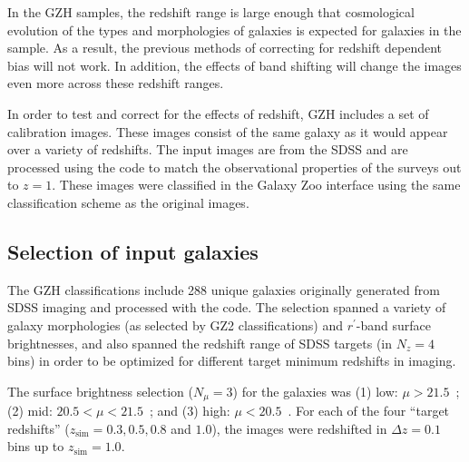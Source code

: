 \documentclass[twocolumn]{aastex6}
\begin{document}
In the GZH samples, the redshift range is large enough that cosmological evolution of the types and morphologies of galaxies is expected for galaxies in the sample. As a result, the previous methods of correcting for redshift dependent bias will not work. In addition, the effects of band shifting will change the images even more across these redshift ranges. %

In order to test and correct for the effects of redshift, GZH includes a set of calibration images. These images consist of the same galaxy as it would appear over a variety of redshifts. The input images are from the SDSS \citep{yor00,str02} and are processed using the \ferengi{} code \citep{bar08a} to match the observational properties of the \hst{} surveys out to $z=1$. These images were classified in the Galaxy Zoo interface using the same classification scheme as the original \hst{} images.
 
\subsection{Selection of \ferengi{} input galaxies}

The GZH classifications include 288 unique galaxies originally generated from SDSS imaging and processed with the \ferengi{} code. The selection spanned a variety of galaxy morphologies (as selected by GZ2 classifications) and $r^\prime$-band surface brightnesses, and also spanned the redshift range of SDSS targets (in $N_z = 4$ bins) in order to be optimized for different target minimum redshifts in \hst{} imaging. 

The surface brightness selection ($N_\mu = 3$) for the \ferengi{} galaxies was (1) low: $\mu > 21.5$~\magarc;  (2) mid: $20.5 < \mu < 21.5$~\magarc; and (3) high: $\mu < 20.5$~\magarc. For each of the four ``target redshifts'' ($z_\mathrm{sim} = 0.3, 0.5, 0.8$ and $1.0$), the images were redshifted in $\Delta z = 0.1$ bins up to $z_\mathrm{sim}=1.0$. 
 
\end{document}
